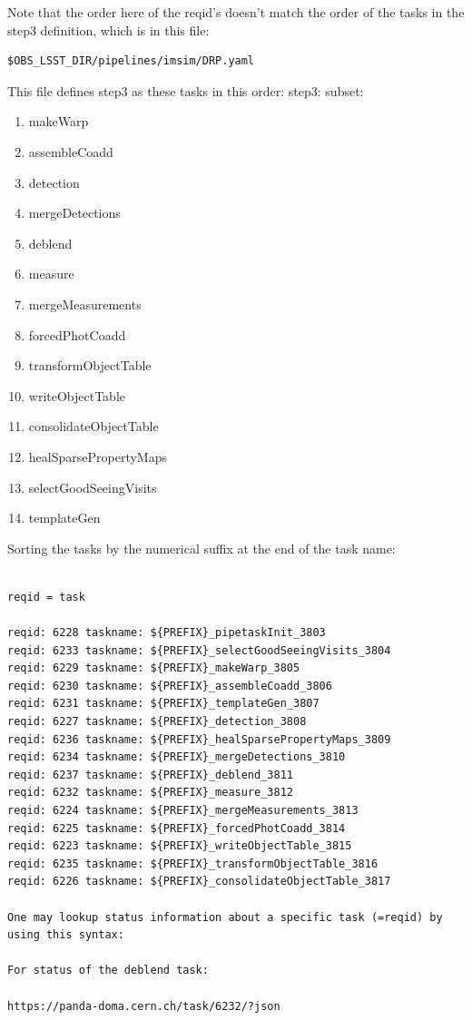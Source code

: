 \documentclass[DM,authoryear,toc]{lsstdoc}
\begin{document}
Note that the order here of the reqid's doesn't match the order
of the tasks in the step3 definition, which is in this file:

\begin{verbatim}
$OBS_LSST_DIR/pipelines/imsim/DRP.yaml
\end{verbatim}

This file defines step3 as these tasks in this order:
    step3:
        subset:
\begin{enumerate}
        \item makeWarp
        \item assembleCoadd
        \item detection
        \item mergeDetections
        \item deblend
        \item measure
        \item mergeMeasurements
        \item forcedPhotCoadd
        \item transformObjectTable
        \item writeObjectTable
        \item consolidateObjectTable
        \item healSparsePropertyMaps
        \item selectGoodSeeingVisits
        \item templateGen
\end{enumerate}

Sorting the tasks by the numerical suffix at the end of the task name:

\begin{verbatim}

reqid = task

reqid: 6228 taskname: ${PREFIX}_pipetaskInit_3803
reqid: 6233 taskname: ${PREFIX}_selectGoodSeeingVisits_3804
reqid: 6229 taskname: ${PREFIX}_makeWarp_3805
reqid: 6230 taskname: ${PREFIX}_assembleCoadd_3806
reqid: 6231 taskname: ${PREFIX}_templateGen_3807
reqid: 6227 taskname: ${PREFIX}_detection_3808
reqid: 6236 taskname: ${PREFIX}_healSparsePropertyMaps_3809
reqid: 6234 taskname: ${PREFIX}_mergeDetections_3810
reqid: 6237 taskname: ${PREFIX}_deblend_3811
reqid: 6232 taskname: ${PREFIX}_measure_3812
reqid: 6224 taskname: ${PREFIX}_mergeMeasurements_3813
reqid: 6225 taskname: ${PREFIX}_forcedPhotCoadd_3814
reqid: 6223 taskname: ${PREFIX}_writeObjectTable_3815
reqid: 6235 taskname: ${PREFIX}_transformObjectTable_3816
reqid: 6226 taskname: ${PREFIX}_consolidateObjectTable_3817

One may lookup status information about a specific task (=reqid) by using this syntax:

For status of the deblend task:

https://panda-doma.cern.ch/task/6232/?json

\end{verbatim}
\end{document}
